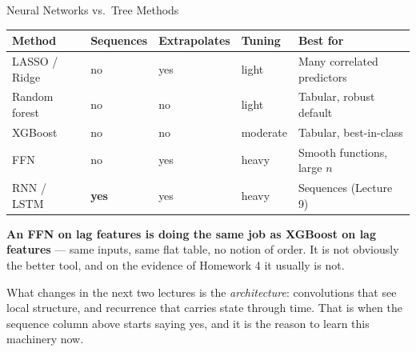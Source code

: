 \documentclass[aspectratio=169, 11pt]{beamer}
\begin{document}
\begin{frame}{Neural Networks vs.\ Tree Methods \parencite{James2021}}
  \begin{center}
    {\small
    \begin{tabular}{lllll}
      \toprule
      \textbf{Method} & \textbf{Sequences} & \textbf{Extrapolates} & \textbf{Tuning} & \textbf{Best for} \\
      \midrule
      LASSO / Ridge & no & yes & light & Many correlated predictors \\
      Random forest & no & no & light & Tabular, robust default \\
      XGBoost & no & no & moderate & Tabular, best-in-class \\
      FFN & no & yes & heavy & Smooth functions, large $n$ \\
      RNN / LSTM & \textbf{yes} & yes & heavy & Sequences (Lecture 9) \\
      \bottomrule
    \end{tabular}
    }
  \end{center}

  \vspace{0.15cm}
  \textbf{An FFN on lag features is doing the same job as XGBoost on lag features} --- same
  inputs, same flat table, no notion of order. It is not obviously the better tool, and on the
  evidence of Homework 4 it usually is not.

  \vspace{0.15cm}
  What changes in the next two lectures is the \emph{architecture}: convolutions that see local
  structure, and recurrence that carries state through time. That is when the sequence column
  above starts saying yes, and it is the reason to learn this machinery now.
\end{frame}
\end{document}
